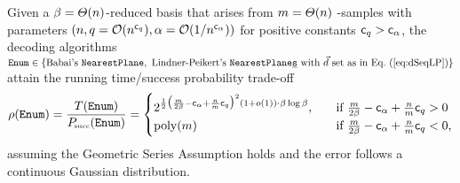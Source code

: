 \begin{corollary} \label{cor:BabaiAndLP}
	Given a $\beta = \varTheta(n)$-\BKZ reduced basis that arises from $m = \varTheta(n)$ \LWE-samples with parameters $(n, q=\mathcal{O}(n^{\mathsf{c}_q}), \alpha = \mathcal{O}(1 / n^{\mathsf{c}_{\alpha}}) )$ for positive constants $\mathsf{c}_q >\mathsf{c}_{\alpha}$, the decoding algorithms $\texttt{Enum} \in \{ \text{Babai's } \texttt{NearestPlane}, \text{ Lindner-Peikert's } \texttt{NearestPlane\underline{s}} \text{ with } \vec d \text{ set as in Eq.~(\ref{eq:dSeqLP})}\}$ attain the running time/success probability trade-off
	\[
		\rho(\texttt{Enum}) = \frac{T(\texttt{Enum})}{P\mkern-4mu_{\mbox{\tiny succ}}(\texttt{Enum})} = \begin{cases}
                  2^{\frac{1}{2} \bigl(\frac{m}{2\beta}-\mathsf{c}_{\alpha} + \frac{n}{m} \mathsf{c}_q  \bigr)^2 (1+o(1)) \cdot \beta\log\beta},			      \quad & \text{if }  \frac{m}{2 \beta} - \mathsf{c}_{\alpha} + \frac{n}{m} \mathsf{c}_q  > 0  \\
                  \mathrm{poly}(m)                                     \quad&\text{if } \frac{m}{2 \beta} - \mathsf{c}_{\alpha} + \frac{n}{m}\mathsf{c}_q  < 0,
                  \end{cases}
	\]
assuming the Geometric Series Assumption holds and the \LWE error follows a continuous Gaussian distribution.
\end{corollary}
